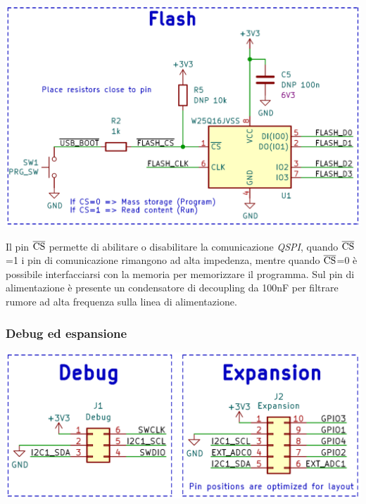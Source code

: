 \begin{center}
\includegraphics[scale=0.2]{figures/image49.png}
\captionsetup{type=figure}
\end{center}

\noindent Il pin $\overline{\rm {CS}}$ permette di abilitare o
disabilitare la comunicazione \emph{QSPI}, quando $\overline{\rm {CS}}$=1 i pin di
comunicazione rimangono ad alta impedenza, mentre quando $\overline{\rm {CS}}$=0 è
possibile interfacciarsi con la memoria per memorizzare il programma.
Sul pin di alimentazione è presente un condensatore di decoupling da 100nF per filtrare rumore ad alta
frequenza sulla linea di alimentazione.

\hypertarget{debug-ed-espansione}{%
\subsubsection{\texorpdfstring{\hfill\break
Debug ed espansione}{ Debug ed espansione}}\label{debug-ed-espansione}}

\begin{center}
\includegraphics[scale=0.2]{figures/image90.png}
\captionsetup{type=figure}
\end{center}

